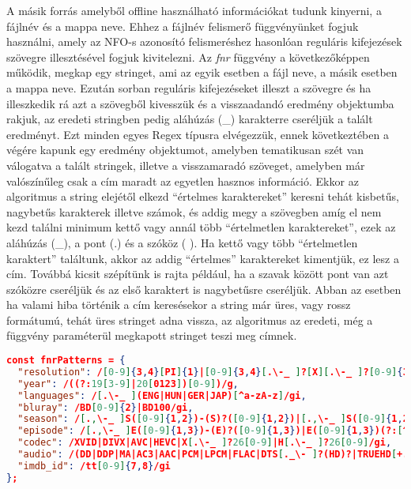 A másik forrás amelyből offline használható információkat tudunk kinyerni, a fájlnév és a mappa neve. Ehhez a fájlnév felismerő függvényünket fogjuk használni, amely az NFO-s azonosító felismeréshez hasonlóan reguláris kifejezések szövegre illesztésével fogjuk kivitelezni.
Az {\it fnr} függvény a következőképpen működik, megkap egy stringet, ami az egyik esetben a fájl neve, a másik esetben a mappa neve. Ezután sorban reguláris kifejezéseket illeszt a szövegre és ha illeszkedik rá azt a szövegből kivesszük és a visszaadandó eredmény objektumba rakjuk, az eredeti stringben pedig aláhúzás (\_) karakterre cseréljük a talált eredményt. Ezt minden egyes Regex típusra elvégezzük, ennek következtében a végére kapunk egy eredmény objektumot, amelyben tematikusan szét van válogatva a talált stringek, illetve a visszamaradó szöveget, amelyben már valószínűleg csak a cím maradt az egyetlen hasznos információ. Ekkor az algoritmus a string elejétől elkezd ``értelmes karaktereket'' keresni tehát kisbetűs, nagybetűs karakterek illetve számok, és addig megy a szövegben amíg el nem kezd találni minimum kettő vagy annál több ``értelmetlen karaktereket'', ezek az aláhúzás (\_), a pont (.) és a szóköz ( ). Ha kettő vagy több ``értelmetlen karaktert'' találtunk, akkor az addig ``értelmes'' karaktereket kimentjük, ez lesz a cím. Továbbá kicsit szépítünk is rajta például, ha a szavak között pont van azt szóközre cseréljük és az első karaktert is nagybetűsre cseréljük. Abban az esetben ha valami hiba történik a cím keresésekor a string már üres, vagy rossz formátumú, tehát üres stringet adna vissza, az algoritmus az eredeti, még a függvény paraméterül megkapott stringet teszi meg címnek.

\begin{lstlisting}[language={json}]
const fnrPatterns = {
  "resolution": /[0-9]{3,4}[PI]{1}|[0-9]{3,4}[.\-_ ]?[X][.\-_ ]?[0-9]{3,4}/gi,
  "year": /((?:19[3-9]|20[0123])[0-9])/g,
  "languages": /[.\-_ ](ENG|HUN|GER|JAP)[^a-zA-z]/gi,
  "bluray": /BD[0-9]{2}|BD100/gi,
  "season": /[.,\-_ ]S([0-9]{1,2})-(S)?([0-9]{1,2})|[.,\-_ ]S([0-9]{1,2})|[^0-9]([0-9]{1,2})X/gi,
  "episode": /[.,\-_ ]E([0-9]{1,3})-(E)?([0-9]{1,3})|E([0-9]{1,3})(?:[^0-9]|$)|[Xx]([0-9]{1,3})(?:[^0-9]|$)|(EP|EPISODE)([0-9]{1,3})(?:[^0-9]|$)/gi,
  "codec": /XVID|DIVX|AVC|HEVC|X[.\-_ ]?26[0-9]|H[.\-_ ]?26[0-9]/gi,
  "audio": /(DD|DDP|MA|AC3|AAC|PCM|LPCM|FLAC|DTS[._\- ]?(HD)?|TRUEHD[+._\- ]?ATMOS|TRUEHD|ATMOS)[+._\- ]?[0-9]\.?[0-9]|DTS[._\- ]?(HD|ES)?|DUAL[._\- ]?AUDIO|DOLBY[+._\- ]?(DIGITAL[+._\- ]?(PLUS)?|VISION|ATMOS)|HALF-OU/gi,
  "imdb_id": /tt[0-9]{7,8}/gi
};
\end{lstlisting}

